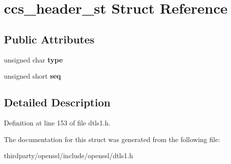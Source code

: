 \hypertarget{structccs__header__st}{}\section{ccs\+\_\+header\+\_\+st Struct Reference}
\label{structccs__header__st}
\subsection*{Public Attributes}
\begin{DoxyCompactItemize}
\item 
\mbox{\label{structccs__header__st_a9dc6e844d9a62957f26d52d475a1f7cb}} 
unsigned char {\bfseries type}
\item 
\mbox{\label{structccs__header__st_a08082f09ae8c97f2e5096ec64ba20cb3}} 
unsigned short {\bfseries seq}
\end{DoxyCompactItemize}


\subsection{Detailed Description}


Definition at line 153 of file dtls1.\+h.



The documentation for this struct was generated from the following file\+:\begin{DoxyCompactItemize}
\item 
thirdparty/openssl/include/openssl/dtls1.\+h\end{DoxyCompactItemize}
